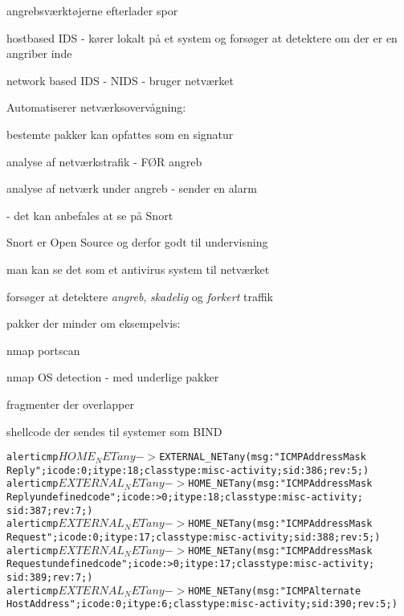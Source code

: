 \documentclass[Screen16to9,17pt]{foils}
\begin{document}

\begin{list1}
  \item angrebsværktøjerne efterlader spor

\item hostbased IDS - kører lokalt på et system og forsøger at
  detektere om der er en angriber inde
\item network based IDS - NIDS - bruger netværket
\item Automatiserer netværksovervågning:
  \begin{list2}
  \item bestemte pakker kan opfattes som en signatur
\item analyse af netværkstrafik - FØR angreb
\item analyse af netværk under angreb - sender en alarm
  \end{list2}
\item {} - det kan anbefales at se på Snort
\end{list1}



\begin{list1}
\item Snort er Open Source og derfor godt til undervisning
\item man kan se det som et antivirus system til netværket
\item forsøger at detektere \emph{angreb}, \emph{skadelig} og
  \emph{forkert} traffik
\item pakker der minder om eksempelvis:
  \begin{list2}
    \item nmap portscan
\item nmap OS detection - med underlige pakker
\item fragmenter der overlapper
\item shellcode der sendes til systemer som BIND
  \end{list2}
\end{list1}


\begin{alltt}\small
alert icmp $HOME_NET any -> $EXTERNAL_NET any (msg:"ICMP Address Mask
Reply"; icode:0; itype:18; classtype:misc-activity; sid:386; rev:5;)
alert icmp $EXTERNAL_NET any -> $HOME_NET any (msg:"ICMP Address Mask
Reply undefined code"; icode:>0; itype:18; classtype:misc-activity;
sid:387; rev:7;)
alert icmp $EXTERNAL_NET any -> $HOME_NET any (msg:"ICMP Address Mask
Request"; icode:0; itype:17; classtype:misc-activity; sid:388; rev:5;)
alert icmp $EXTERNAL_NET any -> $HOME_NET any (msg:"ICMP Address Mask
Request undefined code"; icode:>0; itype:17; classtype:misc-activity;
sid:389; rev:7;)
alert icmp $EXTERNAL_NET any -> $HOME_NET any (msg:"ICMP Alternate
Host Address"; icode:0; itype:6; classtype:misc-activity; sid:390; rev:5;)
\end{alltt}
\end{document}
